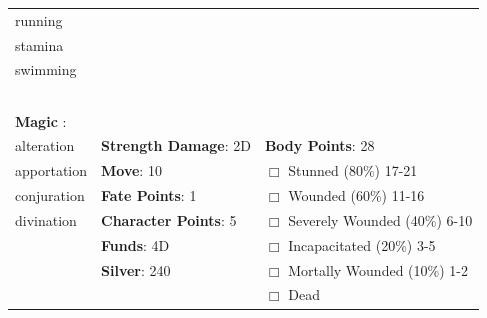 \documentclass[10pt]{article}
\begin{document}
\begin{table}
\begin{tabular}{m{156pt} m{156pt} m{156pt}}
running              \hrulefill &  \hrulefill &  \hrulefill \\

stamina              \hrulefill &  \hrulefill &  \hrulefill \\

swimming             \hrulefill &  \hrulefill &  \hrulefill \\

 \hrulefill &  \hrulefill &  \hrulefill \\

 \hrulefill &  \hrulefill &  \hrulefill \\

 \hrulefill &  \hrulefill &  \hrulefill \\

 \hrulefill &  \hrulefill &  \hrulefill \\

                                  &                                 &                             \\
\textbf{Magic }:  \hrulefill  &                                 &                             \\
alteration           \hrulefill & \textbf{Strength Damage}: 2D \hrulefill                             & \textbf{Body Points}: 28 \hrulefill \\
apportation          \hrulefill                        & \textbf{Move}:             10             \hrulefill    & $\Box$ Stunned \footnotesize{(80\%)} \hfill 17-21 \\
conjuration          \hrulefill                        & \textbf{Fate Points}:      1      \hrulefill    & $\Box$ Wounded \footnotesize{(60\%)} \hfill 11-16 \\
divination           \hrulefill                        & \textbf{Character Points}: 5 \hrulefill    & $\Box$ Severely Wounded \footnotesize{(40\%)} \hfill 6-10 \\
 \hrulefill                        & \textbf{Funds}:            4D            \hrulefill    & $\Box$ Incapacitated \footnotesize{(20\%)} \hfill 3-5 \\
 \hrulefill                        & \textbf{Silver}:           240           \hrulefill    & $\Box$ Mortally Wounded \footnotesize{(10\%)} \hfill 1-2 \\
 \hrulefill                        &  \hrulefill                                                       & $\Box$ Dead   \\
\end{tabular}
\end{table}
\cleardoublepage
\end{document}
